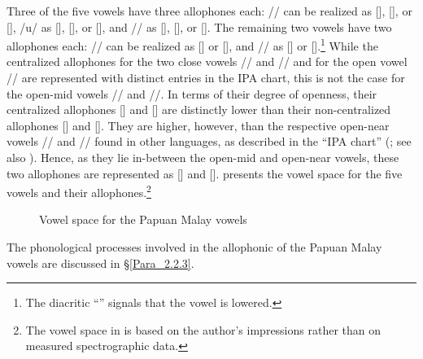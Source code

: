 Three of the five vowels have three allophones each: // can be realized as [], [], or [], /u/ as [], [], or [], and // as [], [], or []. The remaining two vowels have two allophones each: // can be realized as [] or [], and // as [] or [].\footnote{The diacritic “” signals that the vowel is lowered.} While the centralized allophones for the two close vowels // and // and for the open vowel // are represented with distinct entries in the IPA chart, this is not the case for the open-mid vowels // and //. In terms of their degree of openness, their centralized allophones [] and [] are distinctly lower than their non-centralized allophones [] and []. They are higher, however, than the respective open-near vowels // and // found in other languages, as described in the “IPA chart” (\citealt{TheInternationalPhoneticAssociation.2005}; see also \citealt{SILInternational.19962008}). Hence, as they lie in-between the open-mid and open-near vowels, these two allophones are represented as [] and [].  presents the vowel space for the five vowels and their allophones.\footnote{The vowel space in  is based on the author’s impressions rather than on measured spectrographic data.}


  
\begin{figure}

\caption{Vowel space for the Papuan Malay vowels\label{Figure_2.1}}
\end{figure}
 



The phonological processes involved in the allophonic  of the Papuan Malay vowels are discussed in §\ref{Para_2.2.3}.


